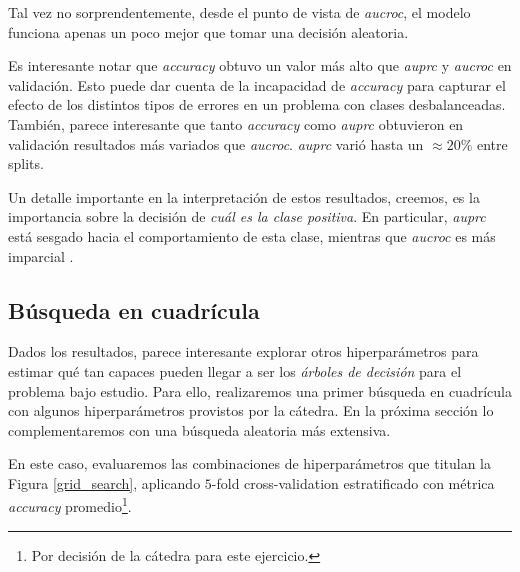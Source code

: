 Tal vez no sorprendentemente, desde el punto de vista de \textit{aucroc}, el modelo funciona apenas un poco mejor que tomar una decisión aleatoria.

Es interesante notar que \textit{accuracy} obtuvo un valor más alto que \textit{auprc} y \textit{aucroc} en validación. Esto puede dar cuenta de la incapacidad de \textit{accuracy} para capturar el efecto de los distintos tipos de errores en un problema con clases desbalanceadas. También, parece interesante que tanto \textit{accuracy} como \textit{auprc} obtuvieron en validación resultados más variados que \textit{aucroc}. \textit{auprc} varió hasta un $\approx 20\%$ entre splits.

Un detalle importante en la interpretación de estos resultados, creemos, es la importancia sobre la decisión de \textit{cuál es la clase positiva}. En particular, \textit{auprc} está sesgado hacia el comportamiento de esta clase, mientras que \textit{aucroc} es más imparcial \cite{Saito}. 


\subsection{Búsqueda en cuadrícula}

Dados los resultados, parece interesante explorar otros hiperparámetros para estimar qué tan capaces pueden llegar a ser los \textit{árboles de decisión} para el problema bajo estudio. Para ello, realizaremos una primer búsqueda en cuadrícula con algunos hiperparámetros provistos por la cátedra. En la próxima sección lo complementaremos con una búsqueda aleatoria más extensiva.

En este caso, evaluaremos las combinaciones de hiperparámetros que titulan la Figura \ref{grid_search}, aplicando $5$-fold cross-validation estratificado con métrica \textit{accuracy} promedio\footnote{Por decisión de la cátedra para este ejercicio.}.

